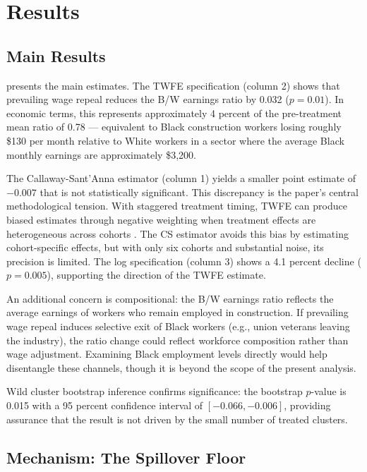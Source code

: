 \documentclass[12pt]{article}
\begin{document}
\section{Results}

\subsection{Main Results}



 presents the main estimates. The TWFE specification (column 2) shows that prevailing wage repeal reduces the B/W earnings ratio by 0.032 ($p = 0.01$). In economic terms, this represents approximately 4 percent of the pre-treatment mean ratio of 0.78 --- equivalent to Black construction workers losing roughly \$130 per month relative to White workers in a sector where the average Black monthly earnings are approximately \$3,200.

The Callaway-Sant'Anna estimator (column 1) yields a smaller point estimate of $-0.007$ that is not statistically significant. This discrepancy is the paper's central methodological tension. With staggered treatment timing, TWFE can produce biased estimates through negative weighting when treatment effects are heterogeneous across cohorts \citep{goodmanbacon2021difference, dechaisemartin2020two}. The CS estimator avoids this bias by estimating cohort-specific effects, but with only six cohorts and substantial noise, its precision is limited. The log specification (column 3) shows a 4.1 percent decline ($p = 0.005$), supporting the direction of the TWFE estimate.

An additional concern is compositional: the B/W earnings ratio reflects the average earnings of workers who remain employed in construction. If prevailing wage repeal induces selective exit of Black workers (e.g., union veterans leaving the industry), the ratio change could reflect workforce composition rather than wage adjustment. Examining Black employment levels directly would help disentangle these channels, though it is beyond the scope of the present analysis.

Wild cluster bootstrap inference confirms significance: the bootstrap $p$-value is 0.015 with a 95 percent confidence interval of $[-0.066, -0.006]$, providing assurance that the result is not driven by the small number of treated clusters.

\subsection{Mechanism: The Spillover Floor}
\end{document}
